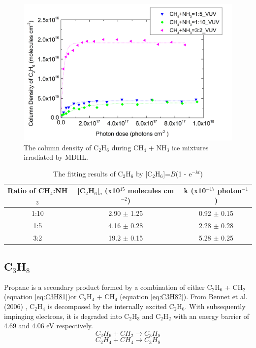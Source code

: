 \begin{figure}
\centering
\includegraphics[width=\textwidth]{figures/chapter3/C2H6_rate_VUV.png}
\caption{The column density of C$_2$H$_6$ during CH$_4$ + NH$_3$ ice mixtures irradiated by MDHL. }
\label{fig:lab_C2H6}
\end{figure}

\begin{table}[htbp]
\caption{The fitting results of C$_2$H$_6$ by [C$_2$H$_6$]=$B$(1 - e$^{-kt}$)}
\label{tab:fittingC2H6}
\begin{tabular}{ccc}
\hline
\hline
Ratio of CH$_4$:NH$_3$ & [C$_2$H$_6$]$_o$ (x10$^{15}$ molecules cm$^{-2}$) & k (x10$^{-17}$ photon$^{-1}$) \\
\hline
1:10 & 2.90 $\pm$ 1.25 & 0.92 $\pm$ 0.15 \\
1:5 & 4.16 $\pm$ 0.28 & 2.28 $\pm$ 0.28 \\
3:2 & 19.2 $\pm$ 0.15 & 5.28 $\pm$ 0.25 \\
\hline
\end{tabular}
\end{table}


\subsection{C$_3$H$_8$}

Propane is a secondary product formed by a combination of either C$_2$H$_6$ + CH$_2$ (equation \ref{eq:C3H81})or C$_2$H$_4$ + CH$_4$ (equation \ref{eq:C3H82}). From Bennet et al. (2006) \cite{bennett2006laboratory}, C$_2$H$_4$ is decomposed by the internally excited C$_2$H$_6$. With subsequently impinging electrons, it is degraded into C$_2$H$_3$ and C$_2$H$_2$ with an energy barrier of 4.69 and 4.06 eV respectively.
\begin{equation}
C_2H_6 + CH_2 \rightarrow C_3H_8
\label{eq:C3H81}
\end{equation}
\begin{equation}
C_2H_4 + CH_4 \rightarrow C_3H_8
\label{eq:C3H82}
\end{equation}

